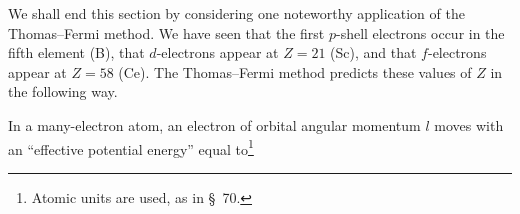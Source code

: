 We shall end this section by considering one noteworthy application of the Thomas--Fermi method. We have seen that the first $p$-shell electrons occur in the fifth element (B), that $d$-electrons appear at $Z=21$ (Sc), and that $f$-electrons appear at $Z=58$ (Ce). The Thomas--Fermi method predicts these values of $Z$ in the following way.

In a many-electron atom, an electron of orbital angular momentum $l$ moves with an ``effective potential energy'' equal to\footnote{Atomic units are used, as in \S~70.}
